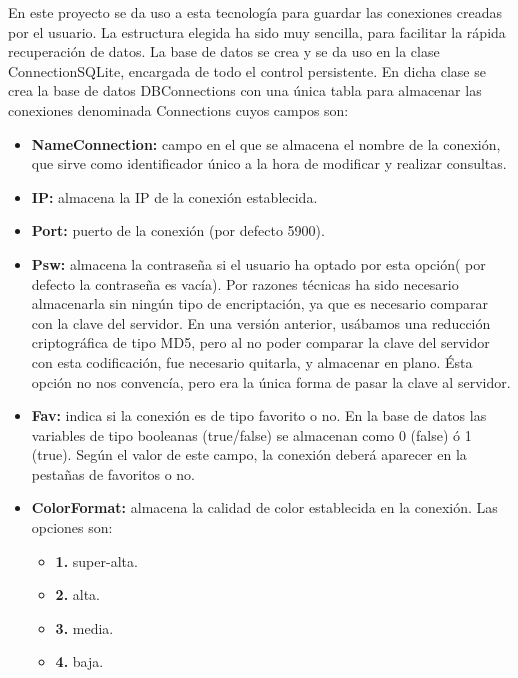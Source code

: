 En este proyecto se da uso a esta tecnología para guardar las conexiones creadas por el usuario. La estructura elegida ha sido muy sencilla, para facilitar la rápida recuperación de datos. La base de datos se crea y se da uso en la clase ConnectionSQLite, encargada de todo el control persistente. En dicha clase se crea la base de datos DBConnections con una única tabla para almacenar las conexiones denominada Connections cuyos campos son:\\

\begin{itemize}

\item \textbf{NameConnection:} campo en el que se almacena el nombre de la conexión, que sirve como identificador único a la hora de modificar y realizar consultas.
\item \textbf{IP:} almacena la IP de la conexión establecida.
\item \textbf{Port:} puerto de la conexión (por defecto 5900).
\item \textbf{Psw:} almacena la contraseña si el usuario ha optado por esta opción( por defecto la contraseña es vacía). Por razones técnicas ha sido necesario almacenarla sin ningún tipo de encriptación, ya que es necesario comparar con la clave del servidor. En una versión anterior, usábamos una reducción criptográfica de tipo MD5, pero al no poder comparar la clave del servidor con esta codificación, fue necesario quitarla, y almacenar en plano. Ésta opción no nos convencía, pero era la única forma de pasar la clave al servidor.
\item \textbf{Fav:} indica si la conexión es de tipo favorito o no. En la base de datos las variables de tipo booleanas (true/false) se almacenan como 0 (false) ó 1 (true). Según el valor de este campo, la conexión deberá aparecer en la pestañas de favoritos o no.
\item \textbf{ColorFormat:} almacena la calidad de color establecida en la conexión. Las opciones son:

\begin{itemize}
\item \textbf{1.} super-alta.
\item \textbf{2.} alta.
\item \textbf{3.} media.
\item \textbf{4.} baja.

\end{itemize}

\end{itemize}

